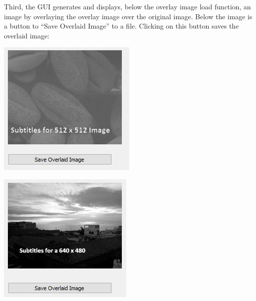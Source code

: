 \documentclass{article}
\newenvironment{Figure}
  {\par\medskip\noindent\ignorespaces\minipage{\linewidth}}
  {\endminipage\par\medskip}
\begin{document}
\begin{multicols*}{2}
Third, the GUI generates and displays, below the overlay image load function, an image by overlaying the overlay image over the original image. Below the image is a button to “Save Overlaid Image” to a file. Clicking on this button saves the overlaid image:


\begin{Figure}
 \centering
 \includegraphics[width=\linewidth]{OverlaidImage.jpg}
\end{Figure}

\begin{Figure}
 \centering
 \includegraphics[width=\linewidth]{OverlaidImage2.jpg}
\end{Figure}


\end{multicols*}
\end{document}
